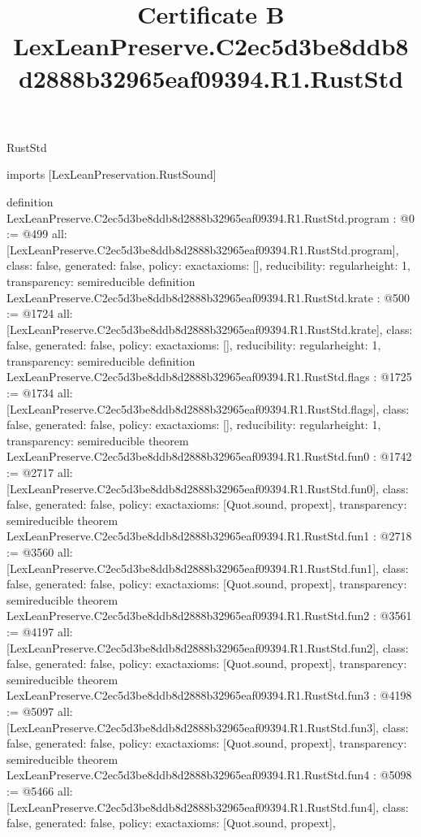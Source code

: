 \begin{lexlean}{RustStd}
\title{Certificate B LexLeanPreserve.C2ec5d3be8ddb8d2888b32965eaf09394.R1.RustStd}
\begin{coremodule}
imports [LexLeanPreservation.RustSound]

definition LexLeanPreserve.C2ec5d3be8ddb8d2888b32965eaf09394.R1.RustStd.program : @0 := @499 {
  all: [LexLeanPreserve.C2ec5d3be8ddb8d2888b32965eaf09394.R1.RustStd.program],
  class: false,
  generated: false,
  policy: exact{axioms: []},
  reducibility: regular{height: 1},
  transparency: semireducible
}
definition LexLeanPreserve.C2ec5d3be8ddb8d2888b32965eaf09394.R1.RustStd.krate : @500 := @1724 {
  all: [LexLeanPreserve.C2ec5d3be8ddb8d2888b32965eaf09394.R1.RustStd.krate],
  class: false,
  generated: false,
  policy: exact{axioms: []},
  reducibility: regular{height: 1},
  transparency: semireducible
}
definition LexLeanPreserve.C2ec5d3be8ddb8d2888b32965eaf09394.R1.RustStd.flags : @1725 := @1734 {
  all: [LexLeanPreserve.C2ec5d3be8ddb8d2888b32965eaf09394.R1.RustStd.flags],
  class: false,
  generated: false,
  policy: exact{axioms: []},
  reducibility: regular{height: 1},
  transparency: semireducible
}
theorem LexLeanPreserve.C2ec5d3be8ddb8d2888b32965eaf09394.R1.RustStd.fun0 : @1742 := @2717 {
  all: [LexLeanPreserve.C2ec5d3be8ddb8d2888b32965eaf09394.R1.RustStd.fun0],
  class: false,
  generated: false,
  policy: exact{axioms: [Quot.sound, propext]},
  transparency: semireducible
}
theorem LexLeanPreserve.C2ec5d3be8ddb8d2888b32965eaf09394.R1.RustStd.fun1 : @2718 := @3560 {
  all: [LexLeanPreserve.C2ec5d3be8ddb8d2888b32965eaf09394.R1.RustStd.fun1],
  class: false,
  generated: false,
  policy: exact{axioms: [Quot.sound, propext]},
  transparency: semireducible
}
theorem LexLeanPreserve.C2ec5d3be8ddb8d2888b32965eaf09394.R1.RustStd.fun2 : @3561 := @4197 {
  all: [LexLeanPreserve.C2ec5d3be8ddb8d2888b32965eaf09394.R1.RustStd.fun2],
  class: false,
  generated: false,
  policy: exact{axioms: [Quot.sound, propext]},
  transparency: semireducible
}
theorem LexLeanPreserve.C2ec5d3be8ddb8d2888b32965eaf09394.R1.RustStd.fun3 : @4198 := @5097 {
  all: [LexLeanPreserve.C2ec5d3be8ddb8d2888b32965eaf09394.R1.RustStd.fun3],
  class: false,
  generated: false,
  policy: exact{axioms: [Quot.sound, propext]},
  transparency: semireducible
}
theorem LexLeanPreserve.C2ec5d3be8ddb8d2888b32965eaf09394.R1.RustStd.fun4 : @5098 := @5466 {
  all: [LexLeanPreserve.C2ec5d3be8ddb8d2888b32965eaf09394.R1.RustStd.fun4],
  class: false,
  generated: false,
  policy: exact{axioms: [Quot.sound, propext]},
}
\end{coremodule}
\end{lexlean}
